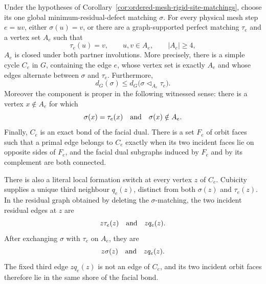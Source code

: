 \begin{corollary}
\label{cor:ordered-mesh-proper-alternating-components}
Under the hypotheses of
Corollary~\ref{cor:ordered-mesh-rigid-site-matchings}, choose its one global
minimum-residual-defect matching \(\sigma\).  For every physical mesh step
\(e=uv\), either \(\sigma(u)=v\), or there are a graph-supported perfect
matching \(\tau_e\) and a vertex set \(A_e\) such that
\[
 \tau_e(u)=v,\qquad u,v\in A_e,\qquad |A_e|\geq4,
\]
\(A_e\) is closed under both partner involutions.  More precisely, there is
a simple cycle \(C_e\) in \(G\), containing the edge \(e\), whose vertex set
is exactly \(A_e\) and whose edges alternate between \(\sigma\) and
\(\tau_e\).  Furthermore,
\[
 d_G(\sigma)
 \leq d_G\bigl(\sigma\mathbin\triangleleft_{A_e}\tau_e\bigr).
\]
Moreover the component is proper in the following witnessed sense: there is
a vertex \(x\notin A_e\) for which
\[
 \sigma(x)=\tau_e(x)
 \quad\hbox{and}\quad
 \sigma(x)\notin A_e.
\]
Finally, \(C_e\) is an exact bond of the facial dual.  There is a set
\(F_e\) of orbit faces such that a primal edge belongs to \(C_e\) exactly
when its two incident faces lie on opposite sides of \(F_e\), and the facial
dual subgraphs induced by \(F_e\) and by its complement are both connected.

There is also a literal local formation switch at every vertex \(z\) of
\(C_e\).  Cubicity supplies a unique third neighbour \(q_e(z)\), distinct
from both \(\sigma(z)\) and \(\tau_e(z)\).  In the residual graph obtained by
deleting the \(\sigma\)-matching, the two incident residual edges at \(z\)
are
\[
             z\tau_e(z)\quad\hbox{and}\quad zq_e(z).
\]
After exchanging \(\sigma\) with \(\tau_e\) on \(A_e\), they are
\[
             z\sigma(z)\quad\hbox{and}\quad zq_e(z).
\]
The fixed third edge \(zq_e(z)\) is not an edge of \(C_e\), and its two
incident orbit faces therefore lie in the same shore of the facial bond.


\end{corollary}
